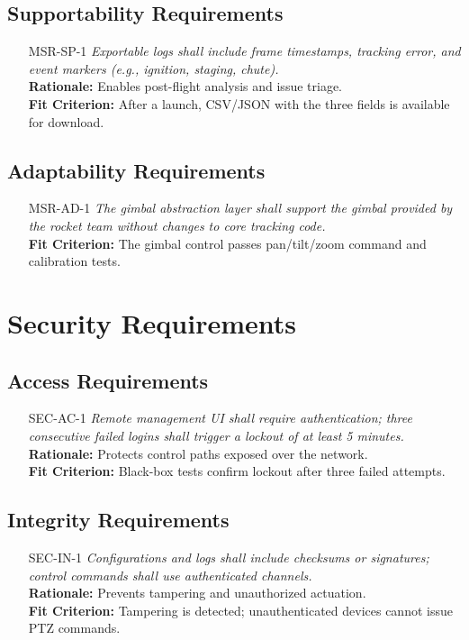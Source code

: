 \documentclass[12pt]{article}
\begin{document}
\subsection{Supportability Requirements}
\begin{itemize}[leftmargin=*]
  \item[MSR-SP-1] \emph{Exportable logs shall include frame timestamps, tracking error,
          and event markers (e.g., ignition, staging, chute).}\\ \textbf{Rationale:}
        Enables post-flight analysis and issue triage.\\ \textbf{Fit Criterion:} After
        a launch, CSV/JSON with the three fields is available for download.
\end{itemize}

\subsection{Adaptability Requirements}
\begin{itemize}[leftmargin=*]
  \item[MSR-AD-1] \emph{The gimbal abstraction layer shall support the gimbal provided
          by the rocket team without changes to core tracking code.}\\ \textbf{Fit
          Criterion:} The gimbal control passes pan/tilt/zoom command and calibration
        tests.
\end{itemize}

\section{Security Requirements}
\subsection{Access Requirements}
\begin{itemize}[leftmargin=*]
  \item[SEC-AC-1] \emph{Remote management UI shall require authentication; three
          consecutive failed logins shall trigger a lockout of at least 5 minutes.}\\
        \textbf{Rationale:} Protects control paths exposed over the network.\\
        \textbf{Fit Criterion:} Black-box tests confirm lockout after three failed
        attempts.
\end{itemize}

\subsection{Integrity Requirements}
\begin{itemize}[leftmargin=*]
  \item[SEC-IN-1] \emph{Configurations and logs shall include checksums or signatures;
          control commands shall use authenticated channels.}\\ \textbf{Rationale:}
        Prevents tampering and unauthorized actuation.\\ \textbf{Fit Criterion:}
        Tampering is detected; unauthenticated devices cannot issue PTZ commands.
\end{itemize}
\end{document}
